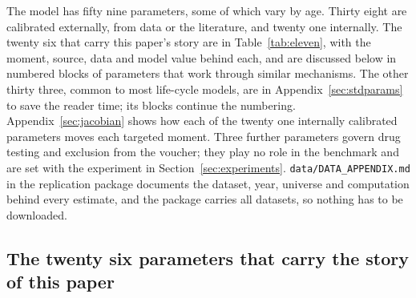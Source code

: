 \documentclass[10pt]{article}
\begin{document}
The model has fifty nine parameters, some of which vary by age. Thirty eight are calibrated externally, from data or the literature, and twenty one internally. The twenty six that carry this paper's story are in Table~\ref{tab:eleven}, with the moment, source, data and model value behind each, and are discussed below in numbered blocks of parameters that work through similar mechanisms. The other thirty three, common to most life-cycle models, are in Appendix~\ref{sec:stdparams} to save the reader time; its blocks continue the numbering. Appendix~\ref{sec:jacobian} shows how each of the twenty one internally calibrated parameters moves each targeted moment. Three further parameters govern drug testing and exclusion from the voucher; they play no role in the benchmark and are set with the experiment in Section~\ref{sec:experiments}. \texttt{data/DATA\_APPENDIX.md} in the replication package documents the dataset, year, universe and computation behind every estimate, and the package carries all datasets, so nothing has to be downloaded.

\subsection{The twenty six parameters that carry the story of this paper}\label{sec:fmainpar}


\end{document}
